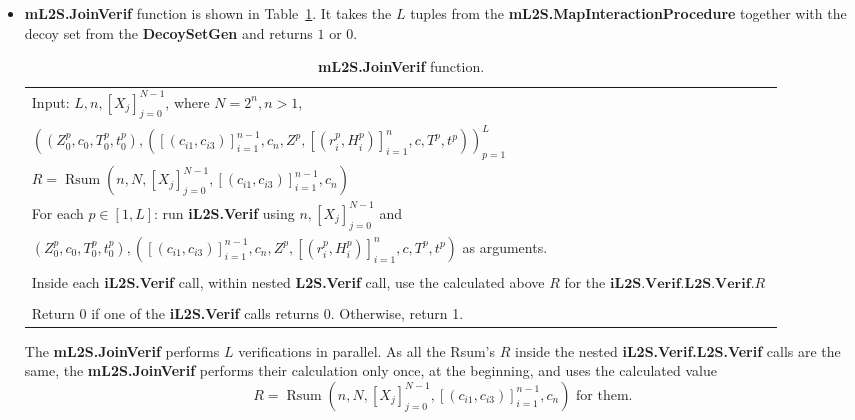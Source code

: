 \documentclass{mathcryptology} %
\DeclareMathOperator{\Rsum}{Rsum}
\theoremstyle{title}
\theoremstyle{titleof}
\begin{document}
    \begin{itemize}
        \item \textbf{mL2S.JoinVerif} function is shown in Table~\ref{Tab:10}. It takes the $L$ tuples from the \textbf{mL2S.MapInteractionProcedure} together with the decoy set from the \textbf{DecoySetGen} and returns $1$ or $0$.

        \begin{table}[!htb]\centering
            \caption{\textbf{mL2S.JoinVerif} function.}\label{Tab:10}
            \begin{tabular}{|>{\raggedright\arraybackslash}p{0.9\linewidth}|}
                \hline
                Input: $L, n, {\left[X_{j}\right]}_{j=0}^{N-1}$, where $N=2^{n}, n>1$,\\
                \hspace{24pt} $
                    {\left(
                        \left(Z_{0}^{p},c_{0},T_{0}^{p},t_{0}^{p}\right),
                        \left(
                            {\left[\left(c_{i1},c_{i3}\right)\right]}_{i=1}^{n-1},
                            c_{n}, Z^{p},
                                {\left[\left(r_{i}^{p},H_{i}^{p}\right)\right]}_{i=1}^{n},
                                c, T^{p}, t^{p}\right)\right)}_{p=1}^{L}
                $
                \\
                \hline
                $R=\Rsum \left(n, N, {\left[X_{j}\right]}_{j=0}^{N-1},
                 {\left[\left(c_{i1}, c_{i3}\right)\right]}_{i=1}^{n-1},
                 c_{n}\right)$\\
                For each $p\in\left[1,L\right]$: run \textbf{iL2S.Verif} using
                $n,{\left[X_{j}\right]}_{j=0}^{N-1}$ and\\
                $\left(Z_{0}^{p},c_{0},T_{0}^{p},t_{0}^{p}\right),
                \left({\left[\left(c_{i1},c_{i3}\right)\right]}_{i=1}^{n-1},
                c_{n}, Z^{p},{\left[\left(r_{i}^{p},H_{i}^{p}\right)\right]}_{i=1}^n,
                c, T^{p},t^{p}\right)$ as arguments.\\
                \\
                Inside each \textbf{iL2S.Verif} call, within nested \textbf{L2S.Verif} call, use the calculated above $R$ for the $\textbf{iL2S.Verif.L2S.Verif}.R$\\
                \\
                Return 0 if one of the \textbf{iL2S.Verif} calls returns 0. Otherwise, return 1.\\
                \hline
            \end{tabular}
        \end{table}

        The \textbf{mL2S.JoinVerif} performs $L$ verifications in parallel. As all the Rsum's $R$ inside the nested \textbf{iL2S.Verif.L2S.Verif} calls are the same, the \textbf{mL2S.JoinVerif} performs their calculation only once, at the beginning, and uses the calculated value
        \begin{equation*}
            R = \Rsum \left(n, N, {\left[X_{j}\right]}_{j=0}^{N-1},
            {\left[\left(c_{i1},c_{i3}\right)\right]}_{i=1}^{n-1},c_{n}\right)\text{ for them}.
        \end{equation*}
    \end{itemize}
\end{document}

